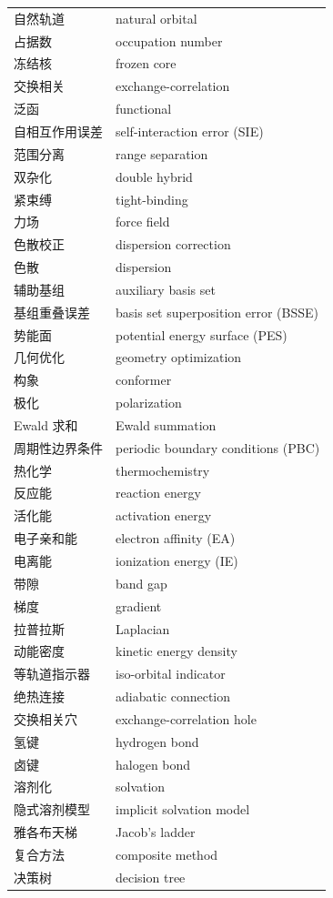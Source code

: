 {\begin{longtable}{@{}p{3.4cm} p{11.2cm}@{}}
自然轨道 & natural orbital \\
占据数 & occupation number \\
冻结核 & frozen core \\
交换相关 & exchange-correlation \\
泛函 & functional \\
自相互作用误差 & self-interaction error (SIE) \\
范围分离 & range separation \\
双杂化 & double hybrid \\
紧束缚 & tight-binding \\
力场 & force field \\
色散校正 & dispersion correction \\
色散 & dispersion \\
辅助基组 & auxiliary basis set \\
基组重叠误差 & basis set superposition error (BSSE) \\
势能面 & potential energy surface (PES) \\
几何优化 & geometry optimization \\
构象 & conformer \\
极化 & polarization \\
Ewald 求和 & Ewald summation \\
周期性边界条件 & periodic boundary conditions (PBC) \\
热化学 & thermochemistry \\
反应能 & reaction energy \\
活化能 & activation energy \\
电子亲和能 & electron affinity (EA) \\
电离能 & ionization energy (IE) \\
带隙 & band gap \\
梯度 & gradient \\
拉普拉斯 & Laplacian \\
动能密度 & kinetic energy density \\
等轨道指示器 & iso-orbital indicator \\
绝热连接 & adiabatic connection \\
交换相关穴 & exchange-correlation hole \\
氢键 & hydrogen bond \\
卤键 & halogen bond \\
溶剂化 & solvation \\
隐式溶剂模型 & implicit solvation model \\
雅各布天梯 & Jacob's ladder \\
复合方法 & composite method \\
决策树 & decision tree \\
\end{longtable}
}

